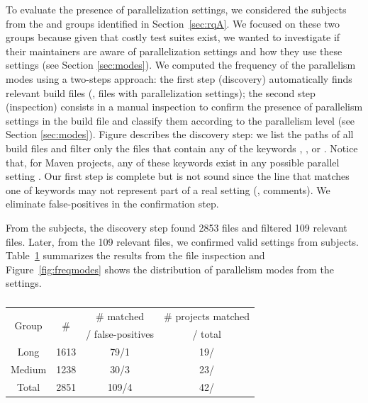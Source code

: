 To evaluate the presence of parallelization settings, we considered
the \numMedLong{} subjects from the \longg{} and \medg{} groups
identified in Section~\ref{sec:rqA}. We focused on these two groups
because given that costly test suites exist, we wanted to investigate
if their maintainers are aware of parallelization settings and how
they use these settings (see Section \ref{sec:modes}).  We computed
the frequency of the parallelism modes using a two-steps approach: the
first step (discovery) automatically finds relevant build files (\ie,
\pomf{} files with parallelization settings); the second step
(inspection) consists in a manual inspection to confirm the presence
of parallelism settings in the build file and classify them according
to the parallelism level (see Section \ref{sec:modes}).
Figure  describes the discovery step: we list
the paths of all build files and filter only the files that contain
any of the keywords , , or
.  Notice that, for Maven projects, any of these
keywords exist in any possible parallel setting . Our first step is complete but is not sound since the line that
matches one of keywords may not represent part of a real setting (\eg,
comments).  We eliminate false-positives in the confirmation step.

From the \numMedLong{} subjects, the discovery step found 2853 files
and filtered 109 relevant files. Later, from the 109 relevant files,
we confirmed  valid settings from  subjects.
 Table~\ref{tab:inspection-table} summarizes
the results from the file inspection and Figure~\ref{fig:freqmodes}
shows the distribution of parallelism modes from the  settings.

\begin{table}[ht!]
    \centering
    \begin{tabular*}{0.48\textwidth}{@{\extracolsep{\fill}}cccc}
        \toprule
        \multirow{2}{*}{Group} & \multirow{2}{*}{\# \pomf{}} & \# \pomf{} matched & \# projects matched\\%
                               &                             &  / false-positives &       / total\\%
        \midrule%
        Long   & 1613 & 79/1 & 19/\numLong{}\\%
        Medium & 1238 & 30/3 & 23/\numMed{}\\%
        \midrule%
        Total  & 2851 & 109/4 & 42/\numMedLong{}\\%
        \bottomrule%
    \end{tabular*}
    \caption{}
    \label{tab:inspection-table} 
\end{table}

